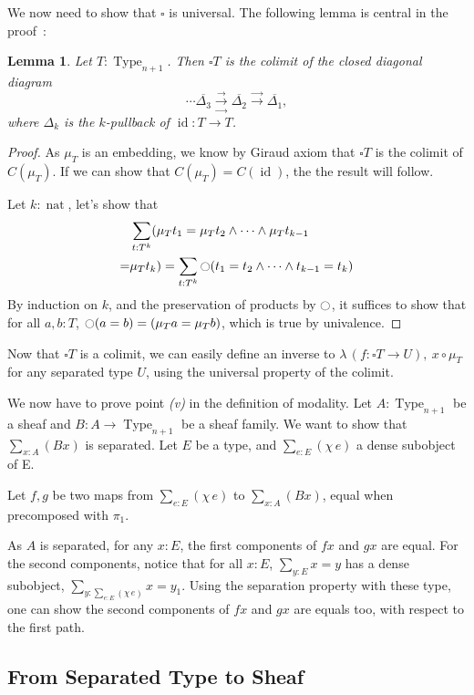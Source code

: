 \documentclass[conference]{IEEEtran}
\newtheorem{lem}[thm]{Lemma}
\DeclareMathOperator{\Type}{Type}
\DeclareMathOperator{\nat}{nat}
\DeclareMathOperator{\id}{id}
\newcommand{\modal}{\ensuremath{\ocircle}}
\begin{document}
We now need to show that $\square$ is universal. The following
lemma is central in the proof~:
\begin{lem}
  Let $T:\Type_{n+1}$. Then $\square T$ is the colimit of the closed
  diagonal diagram
  $$\cdots \overline{\Delta_3} \underset{\longrightarrow}{\stackrel{\longrightarrow}{\longrightarrow}}
   \overline{\Delta_2}
\stackrel{\longrightarrow}{\longrightarrow} \overline{\Delta_1},$$
where $\Delta_k$ is the $k$-pullback of $\id : T \to T$.
\end{lem}
\begin{proof}
  As $\mu_T$ is an embedding, we know by Giraud axiom that $\square T$ is the colimit
  of $C(\mu_T)$. If we can show that $C(\mu_T) = C(\id)$, the the
  result will follow. 

  Let $k:\nat$, let's show that 
\begin{align*}
  &\sum_{t:T^k} (\mu_T t_1 = \mu_T t_2 \land \cdots
    \land \mu_T t_{k-1} \\
  = &\mu_T t_k) = \sum_{t:T^k} \modal (t_1 = t_2 \land \cdots
  \land t_{k-1} = t_k)
\end{align*}
By induction on $k$, and the preservation of products by $\modal$, it
suffices to show that for all $a,b:T$, $\modal (a=b) = (\mu_T a =
\mu_T b)$, which is true by univalence.
\end{proof}

Now that $\square T$ is a colimit, we can easily define an inverse to
$\lambda\,(f:\square T \to U),~x \circ \mu_T$ for any separated type
$U$, using the universal property of the colimit.

We now have to prove point {\it (v)} in the definition of
modality. Let $A:\Type_{n+1}$ be a sheaf and $B:A \to \Type_{n+1}$ be
a sheaf family. We want to show that $\sum_{x:A} (Bx)$ is
separated. Let $E$ be a type, and $\sum_{e:E} (\chi\,e)$ a dense
subobject of E.

Let $f,g$ be two maps from $\sum_{e:E} (\chi\,e)$ to $\sum_{x:A}
(Bx)$, equal when precomposed with $\pi_1$.

As $A$ is separated, for any $x:E$, the first components of $f x$ and
$g x$ are equal. For the second components, notice that for all $x:E$,
$\sum_{y:E} x = y$ has a dense subobject, $\sum_{y:\sum_{e:E} (\chi\,
  e)} x=y_1$. 
Using the separation property with these type, one can show the second
components of $f x$ and $g x$ are equals too, with respect to the
first path.

\subsection{From Separated Type to Sheaf}
\label{ssec:separated-to-sheaf}
\end{document}
